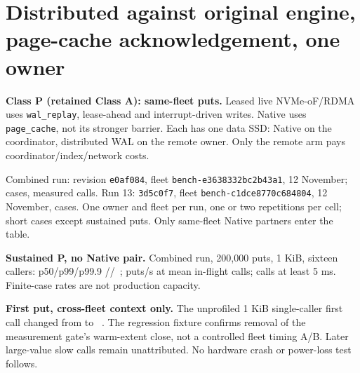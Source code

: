 \clearpage
\section{Distributed against original engine, page-cache acknowledgement, one owner}\label{sec:contract-a}
\textbf{Class P (retained Class A): same-fleet puts.} Leased live NVMe-oF/RDMA
uses \texttt{wal\_replay}, lease-ahead and interrupt-driven writes. Native uses
\texttt{page\_cache}, not its stronger barrier. Each has one data SSD: Native
on the coordinator, distributed WAL on the remote owner. Only the remote arm
pays coordinator/index/network costs.

Combined run: revision \texttt{e0af084}, fleet \texttt{bench-e3638332bc2b43a1},
12 November;  cases,
 measured calls.
Run 13: \texttt{3d5c0f7}, fleet \texttt{bench-c1dce8770c684804}, 12 November,
 cases.
One owner and fleet per run, one or two repetitions per cell; short cases
except sustained puts. Only same-fleet Native partners enter the table.

\begin{table}[H]\centering{}
\caption{Class P (retained Class A): page-cache acknowledgement on both sides.
Matched fleet, size, callers and repetition; API p50/p99/p99.9 in \us.
One Native process/SSD versus one remote owner/SSD; coordinator cache off.
Unprofiled leased \texttt{wal\_replay}, lease-ahead, no write polling.
Sources: each run's \texttt{puts.csv}; exact cases/columns in \texttt{contract-values.csv}.}
\end{table}

\textbf{Sustained P, no Native pair.} Combined run, 200,000 puts, 1 KiB,
sixteen callers: p50/p99/p99.9
//~\us;
 puts/s at
 mean in-flight calls;
 calls at least 5 ms.
Finite-case rates are not production capacity.

\textbf{First put, cross-fleet context only.} The unprofiled 1 KiB single-caller
first call changed from 
to ~\us.
The regression fixture confirms removal of the measurement gate's warm-extent
close, not a controlled fleet timing A/B. Later large-value slow calls remain
unattributed. No hardware crash or power-loss test follows.

\clearpage
